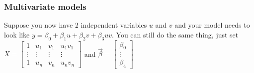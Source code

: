 \subsubsection*{Multivariate models}

Suppose you now have 2 independent variables $u$ and $v$ and your model needs to look like $y = \beta_0 + \beta_1 u + \beta_2 v + \beta_3 uv$. You can still do the same thing, just set $X = \begin{bmatrix}1 & u_1 & v_1 & u_1v_1 \\ \vdots & \vdots & \vdots & \vdots \\ 1 & u_n & v_n & u_nv_n \end{bmatrix}$ and $\Vec{\beta} = \begin{bmatrix}\beta_0 \\ \vdots \\ \beta_4\end{bmatrix}$
